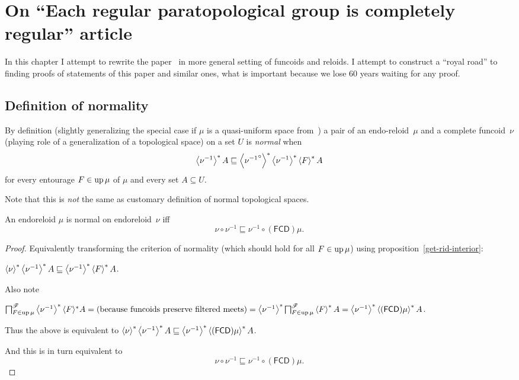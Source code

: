 \chapter{On ``Each regular paratopological group is completely regular'' article}

In this chapter I attempt to rewrite the paper~\cite{2014arXiv1410.1504B} in more general setting of funcoids and reloids.
I attempt to construct a ``royal road'' to finding proofs of statements of this paper and similar ones, what is
important because we lose 60 years waiting for any proof.

\section{Definition of normality}

By definition (slightly generalizing the special case if $\mu$ is a
quasi-uniform space from~\cite{2014arXiv1410.1504B})
a pair of an endo-reloid~$\mu$ and a complete funcoid~$\nu$ (playing role of a generalization of a topological space)
on a set $U$ is \emph{normal} when
\[ \left\langle \nu^{-1}\right\rangle ^{\ast} A \sqsubseteq \left\langle 
{\nu^{-1}}^{\circ}\right\rangle ^{\ast} \left\langle \nu^{-1}\right\rangle ^{\ast} \left\langle F\right\rangle ^{\ast} A \] for every entourage $F \in
\operatorname{up} \mu$ of $\mu$ and every set $A \subseteq U$.

Note that this is \emph{not} the same as customary definition of normal topological spaces.

\begin{thm}
  An endoreloid $\mu$ is normal on endoreloid~$\nu$ iff
  \[ \nu \circ \nu^{-1} \sqsubseteq
  \nu^{-1} \circ (\mathsf{FCD}) \mu. \]
\end{thm}

\begin{proof}
  Equivalently transforming the criterion of normality (which should hold for
  all $F \in \operatorname{up} \mu$) using proposition~\ref{get-rid-interior}:

  $\left\langle \nu\right\rangle ^{\ast}
  \left\langle \nu^{-1}\right\rangle ^{\ast} A \sqsubseteq
  \left\langle \nu^{-1}\right\rangle ^{\ast} \left\langle F\right\rangle ^{\ast} A$.

  Also note
  
  $\bigsqcap^{\mathscr{F}}_{F \in \operatorname{up} \mu} \left\langle  \nu^{-1}
  \right\rangle ^{\ast} \langle F \rangle^{\ast} A = \text{(because funcoids preserve
  filtered meets)} = \left\langle  \nu^{-1}
  \right\rangle ^{\ast}  \bigsqcap^{\mathscr{F}}_{F \in \operatorname{up} \mu} \left\langle F\right\rangle ^{\ast} A =
  \left\langle  \nu^{-1} \right\rangle ^{\ast}
  \left\langle  (\mathsf{FCD}) \mu \right\rangle ^{\ast} A$.

  Thus the above is equivalent to
  $\left\langle \nu\right\rangle ^{\ast}
  \left\langle \nu^{-1}\right\rangle ^{\ast} A \sqsubseteq
  \left\langle  \nu^{-1} \right\rangle ^{\ast}
  \left\langle  (\mathsf{FCD}) \mu \right\rangle ^{\ast} A$.

  And this is in turn equivalent to
  \[ \nu \circ \nu^{-1} \sqsubseteq
  \nu^{-1} \circ (\mathsf{FCD}) \mu. \]
\end{proof}

